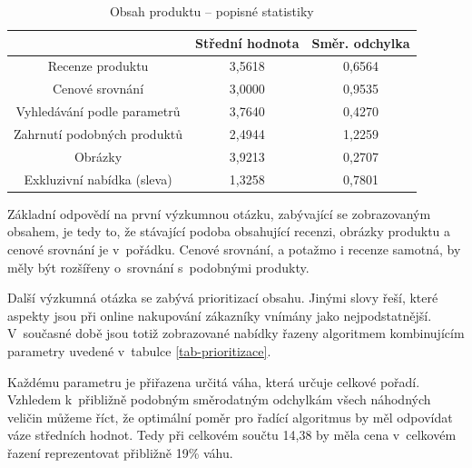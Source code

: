 \documentclass[12pt,oneside,openany]{fithesis}
\begin{document}
\begin{table}[htb]
    \begin{center}%
        \begin{tabular}{|c|c|c|}
            \hline 
            {{}} & {{Střední hodnota}} & {{Směr. odchylka}} 
\tabularnewline
             \hline 
             {{Recenze produktu}} & {{3,5618}} & {{0,6564}} \tabularnewline
              \hline 
              {{Cenové srovnání}} & {{3,0000}} & {{0,9535}} \tabularnewline
               \hline 
               {{Vyhledávání podle parametrů}} & {{3,7640}} & {{0,4270}}
\tabularnewline
                \hline 
                {{Zahrnutí podobných produktů}} & {{2,4944}} & {{1,2259}}
\tabularnewline
                 \hline 
                 {{Obrázky}} & {{3,9213}} & {{0,2707}} \tabularnewline
                  \hline 
                  {{Exkluzivní nabídka (sleva)}} & {{1,3258}} & {{0,7801}}
\tabularnewline
                  \hline 
              \end{tabular}
              \caption{Obsah produktu -- popisné statistiky}\label{tobsah}
          \end{center}
      \end{table}

Základní odpovědí na první výzkumnou otázku, zabývající se 
zobrazovaným obsahem, je tedy to, že stávající podoba obsahující 
recenzi, obrázky produktu a cenové srovnání je v~pořádku. Cenové 
srovnání, a potažmo i recenze samotná, by měly být rozšířeny 
o~srovnání s~podobnými produkty.

Další výzkumná otázka se zabývá prioritizací obsahu. Jinými 
slovy řeší, které aspekty jsou při online nakupování zákazníky 
vnímány jako nejpodstatnější. V~současné době jsou totiž zobrazované 
nabídky řazeny algoritmem kombinujícím parametry uvedené v~tabulce 
\hyperlink{tab-prioritizace}{\ref{tab-prioritizace}}.

Každému parametru je přiřazena určitá 
váha, která určuje celkové pořadí. Vzhledem k~přibližně podobným 
směrodatným odchylkám všech náhodných veličin můžeme říct, že 
optimální poměr pro řadící algoritmus by měl odpovídat váze 
středních hodnot. Tedy při celkovém součtu 14,38 by měla cena v~celkovém 
řazení reprezentovat přibližně 19\% váhu.
\end{document}
